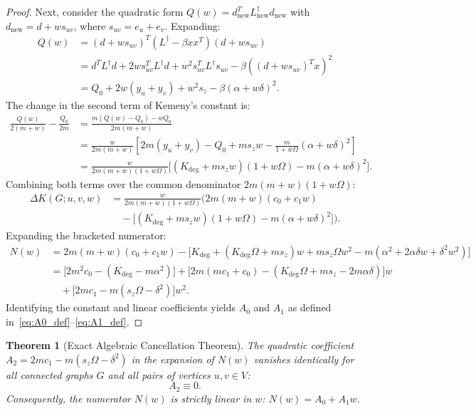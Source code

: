\documentclass[11pt,a4paper]{article}
\theoremstyle{plain}
\newtheorem{theorem}{Theorem}[section]
\theoremstyle{definition}
\begin{document}
\begin{proof}
Next, consider the quadratic form $Q(w) = d_{\mathrm{new}}^T L_{\mathrm{new}}^\dagger d_{\mathrm{new}}$ with $d_{\mathrm{new}} = d + w s_{uv}$, where $s_{uv} = e_u + e_v$. Expanding:
\begin{align}
    Q(w) &= (d + w s_{uv})^T (L^\dagger - \beta x x^T)(d + w s_{uv}) \nonumber \\
    &= d^T L^\dagger d + 2w s_{uv}^T L^\dagger d + w^2 s_{uv}^T L^\dagger s_{uv} - \beta \left( (d + w s_{uv})^T x \right)^2 \nonumber \\
    &= Q_0 + 2w(y_u + y_v) + w^2 s_z - \beta (\alpha + w \delta)^2.
\end{align}
The change in the second term of Kemeny's constant is:
\begin{align}
    \frac{Q(w)}{2(m+w)} - \frac{Q_0}{2m} &= \frac{m(Q(w) - Q_0) - w Q_0}{2m(m+w)} \nonumber \\
    &= \frac{w}{2m(m+w)} \left[ 2m(y_u + y_v) - Q_0 + m s_z w - \frac{m}{1 + w \Omega}(\alpha + w \delta)^2 \right] \nonumber \\
    &= \frac{w}{2m(m+w)(1 + w \Omega)} \Big[ (K_{\mathrm{deg}} + m s_z w)(1 + w \Omega) - m(\alpha + w \delta)^2 \Big].
\end{align}
Combining both terms over the common denominator $2m(m+w)(1+w\Omega)$:
\begin{align}
    \Delta K(G; u, v, w) &= \frac{w}{2m(m+w)(1+w\Omega)} \Big( 2m(m+w)(c_0 + c_1 w) \nonumber \\
    &\quad - \Big[ (K_{\mathrm{deg}} + m s_z w)(1 + w \Omega) - m(\alpha + w \delta)^2 \Big] \Big).
\end{align}
Expanding the bracketed numerator:
\begin{align}
    N(w) &= 2m(m+w)(c_0 + c_1 w) - \Big[ K_{\mathrm{deg}} + (K_{\mathrm{deg}} \Omega + m s_z) w + m s_z \Omega w^2 - m(\alpha^2 + 2\alpha \delta w + \delta^2 w^2) \Big] \nonumber \\
    &= \Big[ 2m^2 c_0 - (K_{\mathrm{deg}} - m \alpha^2) \Big] + \Big[ 2m(m c_1 + c_0) - (K_{\mathrm{deg}} \Omega + m s_z - 2m \alpha \delta) \Big] w \nonumber \\
    &\quad + \Big[ 2m c_1 - m (s_z \Omega - \delta^2) \Big] w^2.
\end{align}
Identifying the constant and linear coefficients yields $A_0$ and $A_1$ as defined in~\eqref{eq:A0_def}--\eqref{eq:A1_def}.
\end{proof}

\begin{theorem}[Exact Algebraic Cancellation Theorem]
\label{thm:cancellation}
The quadratic coefficient $A_2 = 2m c_1 - m(s_z \Omega - \delta^2)$ in the expansion of $N(w)$ vanishes identically for all connected graphs $G$ and all pairs of vertices $u, v \in V$:
\begin{equation}
    A_2 \equiv 0.
\end{equation}
Consequently, the numerator $N(w)$ is strictly linear in $w$: $N(w) = A_0 + A_1 w$.
\end{theorem}
\end{document}
